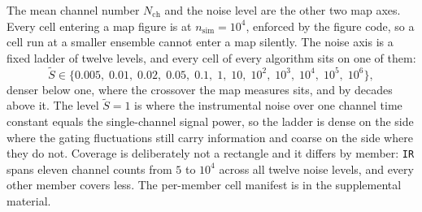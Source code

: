 The mean channel number $N_{\mathrm{ch}}$ and the noise level are the other two map
axes. Every cell entering a map figure is at $n_{\mathrm{sim}} = 10^4$, enforced by the figure
code, so a cell run at a smaller ensemble cannot enter a map silently.
The noise axis is a fixed ladder of twelve levels, and every cell of every algorithm sits on one
of them:
\begin{equation}
  \widetilde{S} \in \{0.005,\; 0.01,\; 0.02,\; 0.05,\; 0.1,\; 1,\; 10,\; 10^2,\; 10^3,\; 10^4,\; 10^5,\; 10^6\},
  \label{eq:noise-ladder}
\end{equation}
denser below one, where the crossover the map measures sits, and by decades above it. The level
$\widetilde{S} = 1$ is where the instrumental noise over one channel time constant equals the
single-channel signal power, so the ladder is dense on the side where the gating fluctuations still
carry information and coarse on the side where they do not.
Coverage is deliberately not a rectangle and it differs by member: \texttt{IR} spans eleven
channel counts from $5$ to $10^4$ across all twelve noise levels, and every
other member covers less. The per-member cell manifest is in the supplemental material.

